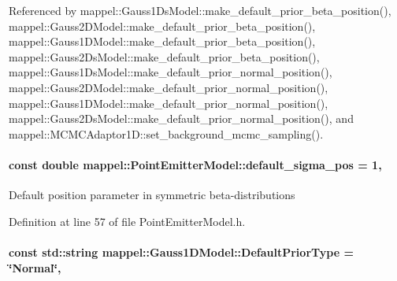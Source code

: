 Referenced by mappel\+::\+Gauss1\+Ds\+Model\+::make\+\_\+default\+\_\+prior\+\_\+beta\+\_\+position(), mappel\+::\+Gauss2\+D\+Model\+::make\+\_\+default\+\_\+prior\+\_\+beta\+\_\+position(), mappel\+::\+Gauss1\+D\+Model\+::make\+\_\+default\+\_\+prior\+\_\+beta\+\_\+position(), mappel\+::\+Gauss2\+Ds\+Model\+::make\+\_\+default\+\_\+prior\+\_\+beta\+\_\+position(), mappel\+::\+Gauss1\+Ds\+Model\+::make\+\_\+default\+\_\+prior\+\_\+normal\+\_\+position(), mappel\+::\+Gauss2\+D\+Model\+::make\+\_\+default\+\_\+prior\+\_\+normal\+\_\+position(), mappel\+::\+Gauss1\+D\+Model\+::make\+\_\+default\+\_\+prior\+\_\+normal\+\_\+position(), mappel\+::\+Gauss2\+Ds\+Model\+::make\+\_\+default\+\_\+prior\+\_\+normal\+\_\+position(), and mappel\+::\+M\+C\+M\+C\+Adaptor1\+D\+::set\+\_\+background\+\_\+mcmc\+\_\+sampling().

\paragraph[{\texorpdfstring{default\+\_\+sigma\+\_\+pos}{default_sigma_pos}}]{\setlength{\rightskip}{0pt plus 5cm}const double mappel\+::\+Point\+Emitter\+Model\+::default\+\_\+sigma\+\_\+pos = 1\hspace{0.3cm}{\ttfamily [static]}, {\ttfamily [inherited]}}\hypertarget{classmappel_1_1PointEmitterModel_aa98a73b9e3937c00b07596d3928df3ca}{}\label{classmappel_1_1PointEmitterModel_aa98a73b9e3937c00b07596d3928df3ca}
Default position parameter in symmetric beta-\/distributions 

Definition at line 57 of file Point\+Emitter\+Model.\+h.

\paragraph[{\texorpdfstring{Default\+Prior\+Type}{DefaultPriorType}}]{\setlength{\rightskip}{0pt plus 5cm}const std\+::string mappel\+::\+Gauss1\+D\+Model\+::\+Default\+Prior\+Type = \char`\"{}Normal\char`\"{}\hspace{0.3cm}{\ttfamily [static]}, {\ttfamily [inherited]}}\hypertarget{classmappel_1_1Gauss1DModel_a4186ce131a5cc9a451ecc0011e4e6682}{}\label{classmappel_1_1Gauss1DModel_a4186ce131a5cc9a451ecc0011e4e6682}


